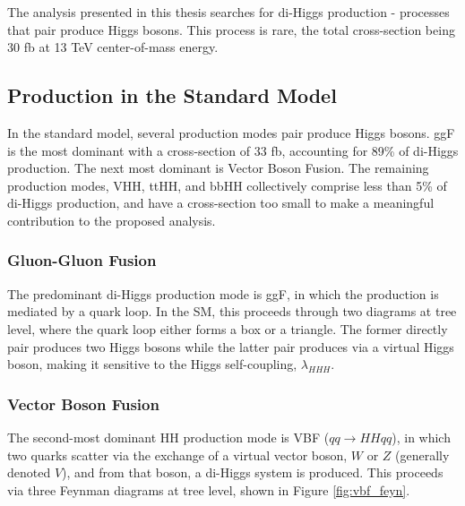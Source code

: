 The analysis presented in this thesis searches for di-Higgs production - processes that pair produce Higgs bosons.   This process is rare, the total cross-section being {\color{red} 30} fb at 13 TeV center-of-mass energy.

\subsection{Production in the Standard Model}
In the standard model, several production modes pair produce Higgs bosons. \gls{ggF} is the most dominant with a cross-section of {\color{red} 33} fb, accounting for {\color{red} 89\%} of di-Higgs production. The next most dominant is Vector Boson Fusion. The remaining production modes, VHH, ttHH, and bbHH collectively comprise less than 5\% of di-Higgs production, and have a cross-section too small to make a meaningful contribution to the proposed analysis.

\subsubsection{Gluon-Gluon Fusion}

The predominant di-Higgs production mode is \gls{ggF}, in which the production is mediated by a quark loop. In the \gls{SM}, this proceeds through two diagrams at tree level, where the quark loop either forms a box or a triangle. The former directly pair produces two Higgs bosons while the latter pair produces via a virtual Higgs boson, making it sensitive to the Higgs self-coupling, $\lambda_{HHH}$.

\subsubsection{Vector Boson Fusion}
The second-most dominant HH production mode is \gls{VBF} ($qq \rightarrow HHqq$), in which two quarks scatter via the exchange of a virtual vector boson, $W$ or $Z$ (generally denoted $V$), and from that boson, a di-Higgs system is produced. This proceeds via three Feynman diagrams at tree level, shown in Figure \ref{fig:vbf_feyn}.


